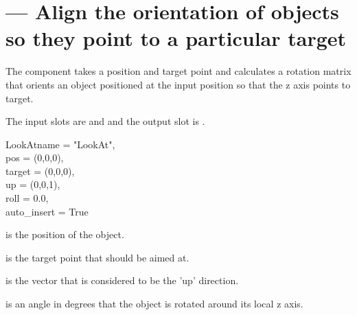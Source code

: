 
\section{ ---
         Align the orientation of objects so they point to a particular target}

The  component takes a position and target point and 
calculates a rotation matrix that orients an object positioned at the
input position so that the z axis points to target.

The input slots are  and  and the output
slot is .

\begin{classdesc}{LookAt}{name = "LookAt",\\ 
			  pos = (0,0,0), \\
                          target = (0,0,0), \\
                          up = (0,0,1), \\
                          roll = 0.0, \\
                          auto_insert = True}

 is the position of the object.

 is the target point that should be aimed at.

 is the vector that is considered to be the 'up' direction.

 is an angle in degrees that the object is rotated around its
local z axis.

\end{classdesc}

